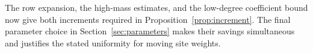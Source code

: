 The row expansion, the high-mass estimates, and the low-degree
coefficient bound now give both increments required in
Proposition~\ref{prop:increment}. The final parameter choice in
Section~\ref{sec:parameters} makes their savings simultaneous and
justifies the stated uniformity for moving site weights.
